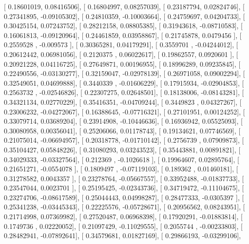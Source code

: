 \documentclass{article}
\begin{document}
       [ 0.18601019,  0.08416506],
       [ 0.16804997,  0.08257039],
       [ 0.23187794,  0.02824746],
       [ 0.27341895, -0.09105302],
       [ 0.24810359, -0.10003664],
       [ 0.24759697,  0.04204733],
       [ 0.30425154,  0.07243752],
       [ 0.28212158,  0.08805385],
       [ 0.31943618, -0.08710583],
       [ 0.16061813, -0.09120964],
       [ 0.24461859,  0.03958867],
       [ 0.21745878,  0.0479456 ],
       [ 0.2559528 , -0.009573  ],
       [ 0.30365281,  0.04179291],
       [ 0.3559701 , -0.04244012],
       [ 0.20612442,  0.06981056],
       [ 0.2120375 ,  0.06022617],
       [ 0.19862557,  0.0920601 ],
       [ 0.20921228,  0.04116725],
       [ 0.27649871,  0.00196955],
       [ 0.18996289,  0.09235845],
       [ 0.22490556, -0.03130277],
       [ 0.32159047, -0.02978139],
       [ 0.26971058,  0.09002294],
       [ 0.32549051,  0.04699888],
       [ 0.3440339 , -0.01606229],
       [ 0.17915934, -0.02904853],
       [ 0.2563732 , -0.02546826],
       [ 0.22307275,  0.02648501],
       [ 0.18138006, -0.08143281],
       [ 0.34321134,  0.02770229],
       [ 0.35416351, -0.04709244],
       [ 0.3449823 ,  0.04327267],
       [ 0.23006232, -0.04272067],
       [ 0.16388645, -0.07716321],
       [ 0.27101951,  0.00124252],
       [ 0.33079714,  0.03689204],
       [ 0.23914908, -0.10446636],
       [ 0.16936942,  0.05525093],
       [ 0.30080958,  0.00356041],
       [ 0.25206066,  0.01178743],
       [ 0.19134621,  0.07746569],
       [ 0.21075014, -0.06694957],
       [ 0.20318778, -0.01710142],
       [ 0.2756739 ,  0.07909873],
       [ 0.35104427,  0.05848226],
       [ 0.31080293,  0.03243523],
       [ 0.35443881,  0.00891821],
       [ 0.34029333, -0.03327564],
       [ 0.212369  , -0.1026618 ],
       [ 0.19964607,  0.02895764],
       [ 0.21651271, -0.0554078 ],
       [ 0.1809497 , -0.07119103],
       [ 0.189362  ,  0.01460181],
       [ 0.31278582,  0.0043357 ],
       [ 0.23278764, -0.05667557],
       [ 0.33952488, -0.01837733],
       [ 0.23547044,  0.0023701 ],
       [ 0.25195425, -0.02343736],
       [ 0.34719472, -0.11104675],
       [ 0.23274706, -0.08617589],
       [ 0.25044443,  0.04998287],
       [ 0.28477333, -0.0305397 ],
       [ 0.25341238, -0.03445343],
       [ 0.22225576, -0.05728671],
       [ 0.20956562,  0.08243951],
       [ 0.21714998,  0.07369982],
       [ 0.27520487,  0.06968398],
       [ 0.17920291, -0.01883814],
       [ 0.1749736 ,  0.02220052],
       [ 0.21097429, -0.11029555],
       [ 0.2055744 , -0.00233803],
       [ 0.28482941, -0.07892641],
       [ 0.34579681,  0.01827169],
       [ 0.29866193, -0.03299106],
\end{document}
